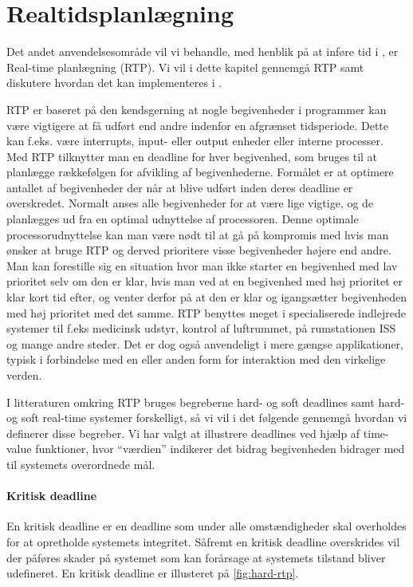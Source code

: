 \chapter{Realtidsplanlægning}
\label{chap:rtp}
\thispagestyle{empty}
Det andet anvendelsesområde vil vi behandle, med henblik på at inføre tid i \pycsp , er Real-time planlægning (RTP). Vi vil i dette kapitel gennemgå RTP samt diskutere hvordan det kan implementeres i \pycsp. 

RTP er baseret på den kendsgerning at nogle begivenheder i programmer kan være vigtigere at få udført end andre indenfor en afgrænset tidsperiode. Dette kan f.eks. være interrupts, input- eller output enheder eller interne processer. Med RTP tilknytter man en deadline for hver begivenhed, som bruges til at planlægge rækkefølgen for afvikling af begivenhederne. Formålet er at optimere antallet af begivenheder der når at blive udført inden deres deadline er overskredet. Normalt anses alle begivenheder for at være lige vigtige, og de planlægges ud fra en optimal udnyttelse af processoren. Denne optimale processorudnyttelse kan man være nødt til at gå på kompromis med hvis man ønsker at bruge RTP og derved prioritere visse begivenheder højere end andre. Man kan forestille sig en situation hvor man ikke starter en begivenhed med lav prioritet selv om den er klar, hvis man ved at en begivenhed med høj prioritet er klar kort tid efter, og venter derfor på at den er klar og igangsætter begivenheden med høj prioritet med det samme. 
RTP benyttes meget i specialiserede indlejrede systemer til f.eks medicinsk udstyr, kontrol af luftrummet, på rumstationen ISS\cite{Audsley1990} og mange andre steder. Det er dog også anvendeligt i mere gængse applikationer, typisk i forbindelse med en eller anden form for interaktion med den virkelige verden. 

I litteraturen omkring RTP bruges begreberne hard- og soft deadlines samt hard- og soft real-time systemer forskelligt, så vi vil i det følgende gennemgå hvordan vi definerer disse begreber. Vi har valgt at illustrere deadlines ved hjælp af time-value funktioner, hvor ``værdien'' indikerer det bidrag begivenheden bidrager med til systemets overordnede mål. 

\subsubsection{Kritisk deadline}
En kritisk deadline er en deadline som under alle omstændigheder skal overholdes for at opretholde systemets integritet. Såfremt en kritisk deadline overskrides vil der påføres skader på systemet som kan forårsage at systemets tilstand bliver udefineret. En kritisk deadline er illusteret på \cref{fig:hard-rtp}.

